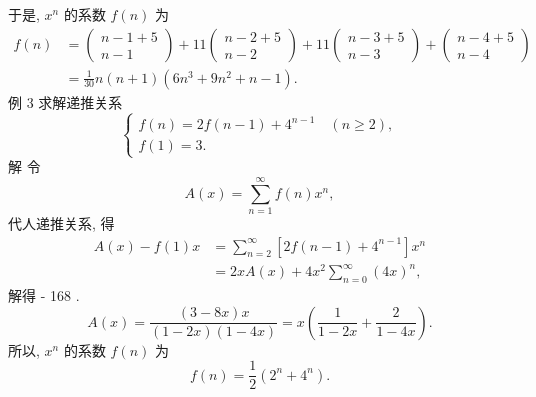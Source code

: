 \documentclass{report}
\begin{document}
于是, $x^n$ 的系数 $f(n)$ 为
$$
\begin{aligned}
	f(n) &=\left(\begin{array}{c}
		n-1+5 \\
		n-1
	\end{array}\right)+11\left(\begin{array}{c}
		n-2+5 \\
		n-2
	\end{array}\right)+11\left(\begin{array}{c}
		n-3+5 \\
		n-3
	\end{array}\right)+\left(\begin{array}{c}
		n-4+5 \\
		n-4
	\end{array}\right) \\
	&=\frac{1}{30} n(n+1)\left(6 n^3+9 n^2+n-1\right) .
\end{aligned}
$$
例 3 求解递推关系
$$
\left\{\begin{array}{l}
	f(n)=2 f(n-1)+4^{n-1} \quad(n \geqslant 2), \\
	f(1)=3 .
\end{array}\right.
$$
解 令
$$
A(x)=\sum_{n=1}^{\infty} f(n) x^n,
$$
代人递推关系, 得
$$
\begin{aligned}
	A(x)-f(1) x &=\sum_{n=2}^{\infty}\left[2 f(n-1)+4^{n-1}\right] x^n \\
	&=2 x A(x)+4 x^2 \sum_{n=0}^{\infty}(4 x)^n,
\end{aligned}
$$
解得
- 168 .
$$
A(x)=\frac{(3-8 x) x}{(1-2 x)(1-4 x)}=x\left(\frac{1}{1-2 x}+\frac{2}{1-4 x}\right) .
$$
所以, $x^n$ 的系数 $f(n)$ 为
$$
f(n)=\frac{1}{2}\left(2^n+4^n\right) .
$$
\end{document}
